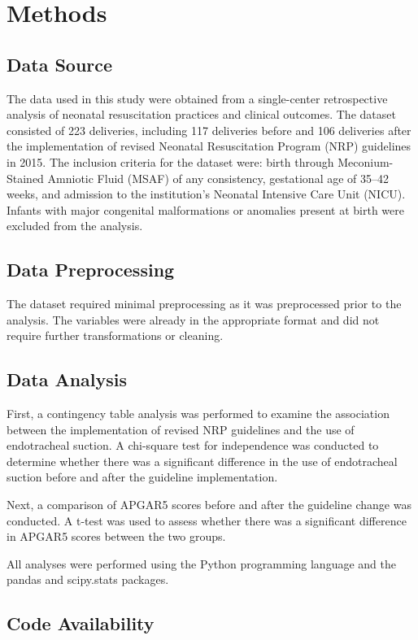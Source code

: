 \documentclass[11pt]{article}
\begin{document}
\section*{Methods}

\subsection*{Data Source}
The data used in this study were obtained from a single-center retrospective analysis of neonatal resuscitation practices and clinical outcomes. The dataset consisted of 223 deliveries, including 117 deliveries before and 106 deliveries after the implementation of revised Neonatal Resuscitation Program (NRP) guidelines in 2015. The inclusion criteria for the dataset were: birth through Meconium-Stained Amniotic Fluid (MSAF) of any consistency, gestational age of 35–42 weeks, and admission to the institution’s Neonatal Intensive Care Unit (NICU). Infants with major congenital malformations or anomalies present at birth were excluded from the analysis.

\subsection*{Data Preprocessing}
The dataset required minimal preprocessing as it was preprocessed prior to the analysis. The variables were already in the appropriate format and did not require further transformations or cleaning. 

\subsection*{Data Analysis}
First, a contingency table analysis was performed to examine the association between the implementation of revised NRP guidelines and the use of endotracheal suction. A chi-square test for independence was conducted to determine whether there was a significant difference in the use of endotracheal suction before and after the guideline implementation.

Next, a comparison of APGAR5 scores before and after the guideline change was conducted. A t-test was used to assess whether there was a significant difference in APGAR5 scores between the two groups.

All analyses were performed using the Python programming language and the pandas and scipy.stats packages.\subsection*{Code Availability}
\end{document}
